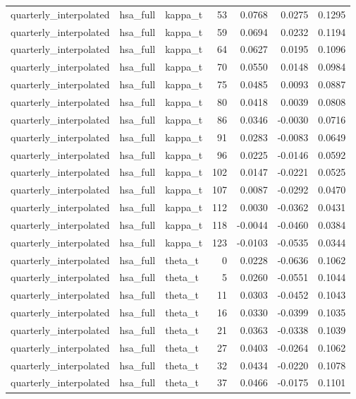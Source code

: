 \begin{tabular}{lllrrrr}
quarterly\_interpolated & hsa\_full & kappa\_t & 53 & 0.0768 & 0.0275 & 0.1295 \\
quarterly\_interpolated & hsa\_full & kappa\_t & 59 & 0.0694 & 0.0232 & 0.1194 \\
quarterly\_interpolated & hsa\_full & kappa\_t & 64 & 0.0627 & 0.0195 & 0.1096 \\
quarterly\_interpolated & hsa\_full & kappa\_t & 70 & 0.0550 & 0.0148 & 0.0984 \\
quarterly\_interpolated & hsa\_full & kappa\_t & 75 & 0.0485 & 0.0093 & 0.0887 \\
quarterly\_interpolated & hsa\_full & kappa\_t & 80 & 0.0418 & 0.0039 & 0.0808 \\
quarterly\_interpolated & hsa\_full & kappa\_t & 86 & 0.0346 & -0.0030 & 0.0716 \\
quarterly\_interpolated & hsa\_full & kappa\_t & 91 & 0.0283 & -0.0083 & 0.0649 \\
quarterly\_interpolated & hsa\_full & kappa\_t & 96 & 0.0225 & -0.0146 & 0.0592 \\
quarterly\_interpolated & hsa\_full & kappa\_t & 102 & 0.0147 & -0.0221 & 0.0525 \\
quarterly\_interpolated & hsa\_full & kappa\_t & 107 & 0.0087 & -0.0292 & 0.0470 \\
quarterly\_interpolated & hsa\_full & kappa\_t & 112 & 0.0030 & -0.0362 & 0.0431 \\
quarterly\_interpolated & hsa\_full & kappa\_t & 118 & -0.0044 & -0.0460 & 0.0384 \\
quarterly\_interpolated & hsa\_full & kappa\_t & 123 & -0.0103 & -0.0535 & 0.0344 \\
quarterly\_interpolated & hsa\_full & theta\_t & 0 & 0.0228 & -0.0636 & 0.1062 \\
quarterly\_interpolated & hsa\_full & theta\_t & 5 & 0.0260 & -0.0551 & 0.1044 \\
quarterly\_interpolated & hsa\_full & theta\_t & 11 & 0.0303 & -0.0452 & 0.1043 \\
quarterly\_interpolated & hsa\_full & theta\_t & 16 & 0.0330 & -0.0399 & 0.1035 \\
quarterly\_interpolated & hsa\_full & theta\_t & 21 & 0.0363 & -0.0338 & 0.1039 \\
quarterly\_interpolated & hsa\_full & theta\_t & 27 & 0.0403 & -0.0264 & 0.1062 \\
quarterly\_interpolated & hsa\_full & theta\_t & 32 & 0.0434 & -0.0220 & 0.1078 \\
quarterly\_interpolated & hsa\_full & theta\_t & 37 & 0.0466 & -0.0175 & 0.1101 \\

\end{tabular}
